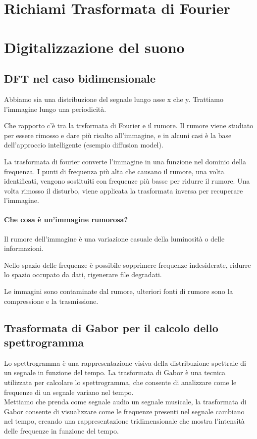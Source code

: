 \section{Richiami Trasformata di Fourier}

\section{Digitalizzazione del suono}

\subsection{DFT nel caso bidimensionale}
Abbiamo sia una distribuzione del segnale lungo asse x che y. Trattiamo l'immagine lungo una periodicità.

Che rapporto c'è tra la trsformata di Fourier e il rumore. Il rumore viene studiato per essere rimosso e dare più risalto all'immagine, e in alcuni casi è la base dell'approccio intelligente (esempio diffusion model).

La trasformata di fourier converte l'immagine in una funzione nel dominio della frequenza. I punti di frequenza più alta che causano il rumore, una volta identificati, vengono sostituiti con frequenze più basse per ridurre il rumore.
Una volta rimosso il disturbo, viene applicata la trasformata inversa per recuperare l'immagine.

\paragraph{Che cosa è un'immagine rumorosa?}
Il rumore dell'immagine è una variazione casuale della luminosità o delle informazioni.

Nello spazio delle frequenze è possibile sopprimere frequenze indesiderate, ridurre lo spazio occupato da dati, rigenerare file degradati. 

Le immagini sono contaminate dal rumore, ulteriori fonti di rumore sono la compressione e la trasmissione. 

\subsection{Trasformata di Gabor per il calcolo dello spettrogramma}
Lo spettrogramma è una rappresentazione visiva della distribuzione spettrale di un segnale in funzione del tempo. La trasformata di Gabor è una tecnica utilizzata per calcolare lo spettrogramma, che consente di analizzare come le frequenze di un segnale variano nel tempo.\\
Mettiamo che prenda come segnale audio un segnale musicale, la trasformata di Gabor consente di visualizzare come le frequenze presenti nel segnale cambiano nel tempo, creando una rappresentazione tridimensionale che mostra l'intensità delle frequenze in funzione del tempo.\\

